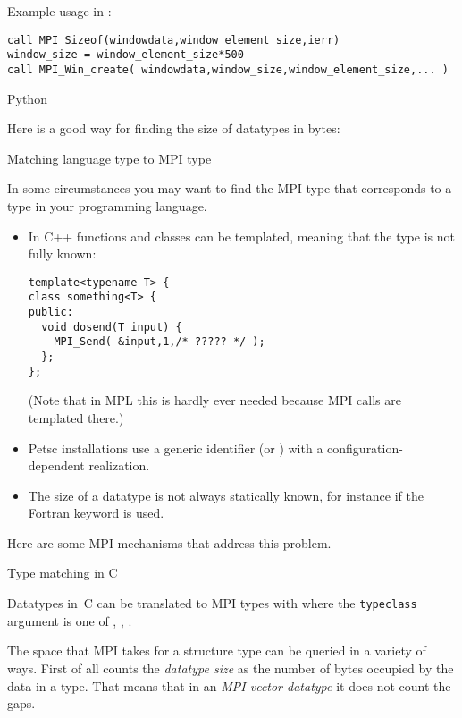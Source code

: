 Example usage in :
\lstset{language=Fortran} %
\begin{lstlisting}
call MPI_Sizeof(windowdata,window_element_size,ierr)
window_size = window_element_size*500
call MPI_Win_create( windowdata,window_size,window_element_size,... )
\end{lstlisting}
\lstset{language=C} %

 {Python}

Here is a good way for finding the size of  datatypes
in bytes:

 {Matching language type to MPI type}
\label{sec:mpi-type-match}

In some circumstances you may want to find the MPI type
that corresponds to a type in your programming language.
\begin{itemize}
\item In C++ functions and classes can be templated,
  meaning that the type is not fully known:
\begin{lstlisting}
template<typename T> {
class something<T> {
public:
  void dosend(T input) {
    MPI_Send( &input,1,/* ????? */ );
  };
};
\end{lstlisting}
(Note that in \ac{MPL} this is hardly ever needed
because MPI calls are templated there.)
\item Petsc installations use a generic identifier 
  (or )
  with a configuration-dependent realization.
\item The size of a datatype is not always statically known, for instance if
the Fortran  keyword is used.
\end{itemize}

Here are some MPI mechanisms that address this problem.

 {Type matching in C}
\label{sec:mpi-type-match-c}

Datatypes in~C can be translated to MPI types with
%
%
where the \lstinline{typeclass} argument is one of
,
,
.


The space that MPI takes for a structure type can be queried in a
variety of ways. First of all  counts the
\emph{datatype size} as the 
number of bytes occupied by the data in a type. That means that in an
\emph{MPI vector datatype} it does not
count the gaps.
%

